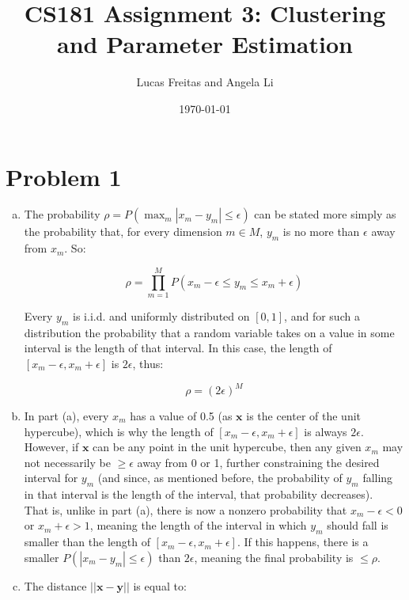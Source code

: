 \documentclass{article}
\title{CS181 Assignment 3: Clustering and Parameter Estimation}
\author{Lucas Freitas and Angela Li}
\date{\today}
\begin{document}
\maketitle

\section*{Problem 1}

\begin{enumerate}[a.]

\item %

The probability $\rho = P(\max_m |x_m - y_m| \leq \epsilon)$ can be stated more simply as the probability that, for every dimension $m \in M$, $y_m$ is no more than $\epsilon$ away from $x_m$. So:

$$\displaystyle \rho = \prod_{m = 1}^{M} P(x_m - \epsilon \leq y_m \leq x_m + \epsilon)$$

Every $y_m$ is i.i.d. and uniformly distributed on $[0, 1]$, and for such a distribution the probability that a random variable takes on a value in some interval is the length of that interval. In this case, the length of $[x_m - \epsilon, x_m + \epsilon]$ is $2\epsilon$, thus: 

$$\rho = (2\epsilon)^M$$

\item %

In part (a), every $x_m$ has a value of 0.5 (as $\bm{x}$ is the center of the unit hypercube), which is why the length of $[x_m - \epsilon, x_m + \epsilon]$ is always $2\epsilon$. However, if $\bm{x}$ can be any point in the unit hypercube, then any given $x_m$ may not necessarily be $\geq \epsilon$ away from 0 or 1, further constraining the desired interval for $y_m$ (and since, as mentioned before, the probability of $y_m$ falling in that interval is the length of the interval, that probability decreases). \\

That is, unlike in part (a), there is now a nonzero probability that $x_m - \epsilon < 0$ or $x_m + \epsilon > 1$, meaning the length of the interval in which $y_m$ should fall is smaller than the length of $[x_m - \epsilon, x_m + \epsilon]$. If this happens, there is a smaller $P(|x_m - y_m| \leq \epsilon)$ than $2\epsilon$, meaning the final probability is $\leq \rho$.

\item %

The distance $||\bm{x} - \bm{y}||$ is equal to:


\end{enumerate}
\end{document}
